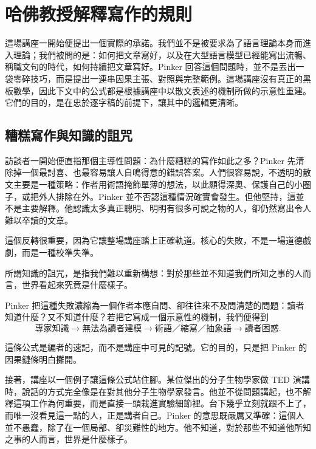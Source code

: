 \chapter{哈佛教授解釋寫作的規則}

這場講座一開始便提出一個實際的承諾。我們並不是被要求為了語言理論本身而進入理論；我們被問的是：如何把文章寫好，以及在大型語言模型已經能寫出流暢、稱職文句的時代，如何持續把文章寫好。Pinker 回答這個問題時，並不是丟出一袋零碎技巧，而是提出一連串因果主張、對照與完整範例。這場講座沒有真正的黑板數學，因此下文中的公式都是根據講座中以散文表述的機制所做的示意性重建。它們的目的，是在忠於逐字稿的前提下，讓其中的邏輯更清晰。

\section{糟糕寫作與知識的詛咒}

訪談者一開始便直指那個主導性問題：為什麼糟糕的寫作如此之多？Pinker 先清除掉一個最討喜、也最容易讓人自鳴得意的錯誤答案。人們很容易說，不透明的散文主要是一種策略：作者用術語掩飾單薄的想法，以此顯得深奧、保護自己的小圈子，或把外人排除在外。Pinker 並不否認這種情況確實會發生。但他堅持，這並不是主要解釋。他認識太多真正聰明、明明有很多可說之物的人，卻仍然寫出令人難以卒讀的文章。

這個反轉很重要，因為它讓整場講座踏上正確軌道。核心的失敗，不是一場道德戲劇，而是一種校準失準。

\begin{definition}
所謂知識的詛咒，是指我們難以重新構想：對於那些並不知道我們所知之事的人而言，世界看起來究竟是什麼樣子。
\end{definition}

Pinker 把這種失敗濃縮為一個作者本應自問、卻往往來不及問清楚的問題：讀者知道什麼？又不知道什麼？若把它寫成一個示意性的機制，我們便得到
\begin{equation}
\text{專家知識} \to \text{無法為讀者建模} \to \text{術語／縮寫／抽象語} \to \text{讀者困惑}.
\end{equation}

\begin{remark}
這條公式是編者的速記，而不是講座中可見的記號。它的目的，只是把 Pinker 的因果鏈條明白攤開。
\end{remark}

接著，講座以一個例子讓這條公式站住腳。某位傑出的分子生物學家做 TED 演講時，說話的方式完全像是在對其他分子生物學家發言。他並不從問題講起，也不解釋這項工作為何重要，而是直接一頭栽進實驗細節裡。台下幾乎立刻就跟不上了，而唯一沒看見這一點的人，正是講者自己。Pinker 的意思既嚴厲又準確：這個人並不愚蠢，除了在一個局部、卻災難性的地方。他不知道，對於那些不知道他所知之事的人而言，世界是什麼樣子。

